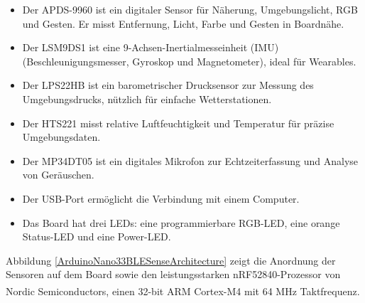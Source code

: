 \begin{itemize}
	\item Der APDS-9960 ist ein digitaler Sensor für Näherung, Umgebungslicht, RGB und Gesten. Er misst Entfernung, Licht, Farbe und Gesten in Boardnähe.
	\item Der LSM9DS1 ist eine 9-Achsen-Inertialmesseinheit (IMU) (Beschleunigungsmesser, Gyroskop und Magnetometer), ideal für Wearables.
	\item Der LPS22HB ist ein barometrischer Drucksensor zur Messung des Umgebungsdrucks, nützlich für einfache Wetterstationen.
	\item Der HTS221 misst relative Luftfeuchtigkeit und Temperatur für präzise Umgebungsdaten.
	\item Der MP34DT05 ist ein digitales Mikrofon zur Echtzeiterfassung und Analyse von Geräuschen.
	\item Der USB-Port ermöglicht die Verbindung mit einem Computer.
	\item Das Board hat drei LEDs: eine programmierbare RGB-LED, eine orange Status-LED und eine Power-LED.
\end{itemize}

Abbildung \ref{ArduinoNano33BLESenseArchitecture} zeigt die Anordnung der Sensoren auf dem Board sowie den leistungsstarken nRF52840-Prozessor von Nordic Semiconductors, einen 32-bit ARM\textsuperscript{\textregistered} Cortex\textsuperscript{\texttrademark}-M4 mit 64 MHz Taktfrequenz.

